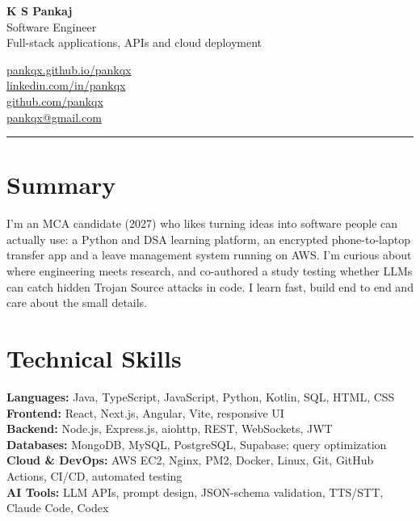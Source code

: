 \documentclass[a4paper,10pt]{article}
\begin{document}
\noindent
\begin{minipage}[t]{0.55\textwidth}
  \raggedright
  {\LARGE\bfseries K S Pankaj}\\[7pt]
  Software Engineer\\
  \small Full-stack applications, APIs and cloud deployment\\
\end{minipage}%
\begin{minipage}[t]{0.45\textwidth}
  \raggedleft
  \href{https://pankqx.github.io/pankqx}{pankqx.github.io/pankqx}\\[1pt]
  \href{https://linkedin.com/in/pankqx}{linkedin.com/in/pankqx}\\[1pt]
  \href{https://github.com/pankqx}{github.com/pankqx}\\[1pt]
  \href{mailto:pankqx@gmail.com}{pankqx@gmail.com}
\end{minipage}
\vspace{3pt}
\hrule

\section*{Summary}
I'm an MCA candidate (2027) who likes turning ideas into software people can actually use: a Python and DSA learning platform, an encrypted phone-to-laptop transfer app and a leave management system running on AWS. I'm curious about where engineering meets research, and co-authored a study testing whether LLMs can catch hidden Trojan Source attacks in code. I learn fast, build end to end and care about the small details.

\section*{Technical Skills}
\textbf{Languages:} Java, TypeScript, JavaScript, Python, Kotlin, SQL, HTML, CSS\\
\textbf{Frontend:} React, Next.js, Angular, Vite, responsive UI\\
\textbf{Backend:} Node.js, Express.js, aiohttp, REST, WebSockets, JWT\\
\textbf{Databases:} MongoDB, MySQL, PostgreSQL, Supabase; query optimization\\
\textbf{Cloud \& DevOps:} AWS EC2, Nginx, PM2, Docker, Linux, Git, GitHub Actions, CI/CD, automated testing\\
\textbf{AI Tools:} LLM APIs, prompt design, JSON-schema validation, TTS/STT, Claude Code, Codex
\end{document}

